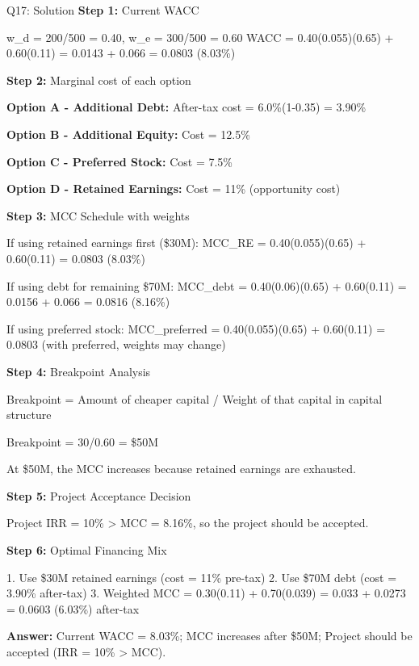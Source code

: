 \documentclass{beamer}
\renewcommand{\scriptsize}{\fontsize{6pt}{7pt}\selectfont}
\begin{document}
	\begin{frame}{Q17: Solution}
		\scriptsize
		\textbf{Step 1:} Current WACC
		
		w\_d = 200/500 = 0.40, w\_e = 300/500 = 0.60
		WACC = 0.40(0.055)(0.65) + 0.60(0.11) = 0.0143 + 0.066 = 0.0803 (8.03\%)
		
		\vspace{2pt}
		\textbf{Step 2:} Marginal cost of each option
		
		\textbf{Option A - Additional Debt:}
		After-tax cost = 6.0\%(1-0.35) = 3.90\%
		
		\textbf{Option B - Additional Equity:}
		Cost = 12.5\%
		
		\textbf{Option C - Preferred Stock:}
		Cost = 7.5\%
		
		\textbf{Option D - Retained Earnings:}
		Cost = 11\% (opportunity cost)
		
		\vspace{2pt}
		\textbf{Step 3:} MCC Schedule with weights
		
		If using retained earnings first (\$30M):
		MCC\_RE = 0.40(0.055)(0.65) + 0.60(0.11) = 0.0803 (8.03\%)
		
		If using debt for remaining \$70M:
		MCC\_debt = 0.40(0.06)(0.65) + 0.60(0.11) = 0.0156 + 0.066 = 0.0816 (8.16\%)
		
		If using preferred stock:
		MCC\_preferred = 0.40(0.055)(0.65) + 0.60(0.11) = 0.0803 (with preferred, weights may change)
		
		\vspace{2pt}
		\textbf{Step 4:} Breakpoint Analysis
		
		Breakpoint = Amount of cheaper capital / Weight of that capital in capital structure
		
		Breakpoint = 30/0.60 = \$50M
		
		At \$50M, the MCC increases because retained earnings are exhausted.
		
		\vspace{2pt}
		\textbf{Step 5:} Project Acceptance Decision
		
		Project IRR = 10\% > MCC = 8.16\%, so the project should be accepted.
		
		\vspace{2pt}
		\textbf{Step 6:} Optimal Financing Mix
		
		1. Use \$30M retained earnings (cost = 11\% pre-tax)
		2. Use \$70M debt (cost = 3.90\% after-tax)
		3. Weighted MCC = 0.30(0.11) + 0.70(0.039) = 0.033 + 0.0273 = 0.0603 (6.03\%) after-tax
		
		\textbf{Answer:} Current WACC = 8.03\%; MCC increases after \$50M; Project should be accepted (IRR = 10\% > MCC).
	\end{frame}
	
\end{document}
